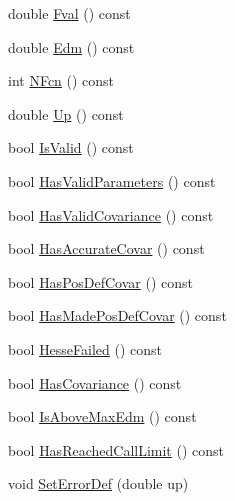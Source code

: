 \begin{DoxyCompactItemize}
\item 
double \mbox{\hyperlink{classROOT_1_1Minuit2_1_1FunctionMinimum_a72aa9fd2b33f1bb56c5b053d536cc32c}{Fval}} () const
\item 
double \mbox{\hyperlink{classROOT_1_1Minuit2_1_1FunctionMinimum_aef90d7ca242a7ea211d56b188679f4b9}{Edm}} () const
\item 
int \mbox{\hyperlink{classROOT_1_1Minuit2_1_1FunctionMinimum_a8af0f1813c9ae51d7a57a1de0cbae42f}{N\+Fcn}} () const
\item 
double \mbox{\hyperlink{classROOT_1_1Minuit2_1_1FunctionMinimum_a53be50e5f3a36b22144bb98fc55c9340}{Up}} () const
\item 
bool \mbox{\hyperlink{classROOT_1_1Minuit2_1_1FunctionMinimum_a6525270e63f1cf16206387257b247b69}{Is\+Valid}} () const
\item 
bool \mbox{\hyperlink{classROOT_1_1Minuit2_1_1FunctionMinimum_a723b0ab6157e57113a142f1d4a31ace2}{Has\+Valid\+Parameters}} () const
\item 
bool \mbox{\hyperlink{classROOT_1_1Minuit2_1_1FunctionMinimum_ac2510d8f560ddac6b2911bda454e2948}{Has\+Valid\+Covariance}} () const
\item 
bool \mbox{\hyperlink{classROOT_1_1Minuit2_1_1FunctionMinimum_a5135f697042ef9ad81c68185c8610019}{Has\+Accurate\+Covar}} () const
\item 
bool \mbox{\hyperlink{classROOT_1_1Minuit2_1_1FunctionMinimum_acb9f7255fdd8afdb460bfe13e6d119c4}{Has\+Pos\+Def\+Covar}} () const
\item 
bool \mbox{\hyperlink{classROOT_1_1Minuit2_1_1FunctionMinimum_a7c0f417444609960c3b55bc869bf04d8}{Has\+Made\+Pos\+Def\+Covar}} () const
\item 
bool \mbox{\hyperlink{classROOT_1_1Minuit2_1_1FunctionMinimum_a6400b299323d7e632692229ce026056c}{Hesse\+Failed}} () const
\item 
bool \mbox{\hyperlink{classROOT_1_1Minuit2_1_1FunctionMinimum_ae11c13bd945f21476482d928bf96b791}{Has\+Covariance}} () const
\item 
bool \mbox{\hyperlink{classROOT_1_1Minuit2_1_1FunctionMinimum_aa87b9f0f50a77d219976b8767e39ac0f}{Is\+Above\+Max\+Edm}} () const
\item 
bool \mbox{\hyperlink{classROOT_1_1Minuit2_1_1FunctionMinimum_a524af3e3da7a975e7a104845c6a41ceb}{Has\+Reached\+Call\+Limit}} () const
\item 
void \mbox{\hyperlink{classROOT_1_1Minuit2_1_1FunctionMinimum_af45892d274c493850fc78e9917f17781}{Set\+Error\+Def}} (double up)
\end{DoxyCompactItemize}



